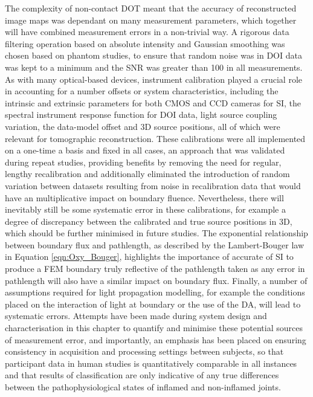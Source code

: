 \documentclass[twoside]{bhamthesis}
\theoremstyle{definition}
\begin{document}
The complexity of non-contact DOT meant that the accuracy of reconstructed image maps was dependant on many measurement parameters, which together will have combined measurement errors in a non-trivial way. A rigorous data filtering operation based on absolute intensity and Gaussian smoothing was chosen based on phantom studies, to ensure that random noise was in DOI data was kept to a minimum and the SNR was greater than 100 in all measurements. As with many optical-based devices, instrument calibration played a crucial role in accounting for a number offsets or system characteristics, including the intrinsic and extrinsic parameters for both CMOS and CCD cameras for SI, the spectral instrument response function for DOI data, light source coupling variation, the data-model offset and 3D source positions, all of which were relevant for tomographic reconstruction. These calibrations were all implemented on a one-time a basis and fixed in all cases, an approach that was validated during repeat studies, providing benefits by removing the need for regular, lengthy recalibration and additionally eliminated the introduction of random variation between datasets resulting from noise in recalibration data that would have an multiplicative impact on boundary fluence. Nevertheless, there will inevitably still be some systematic error in these calibrations, for example a degree of discrepancy between the calibrated and true source positions in 3D, which should be further minimised in future studies. The exponential relationship between boundary flux and pathlength, as described by the Lambert-Bouger law in Equation \ref{eqn:Oxy_Bouger}, highlights the importance of accurate of SI to produce a FEM boundary truly reflective of the pathlength taken as any error in pathlength will also have a similar impact on boundary flux. Finally, a number of assumptions required for light propagation modelling, for example the conditions placed on the interaction of light at boundary or the use of the DA, will lead to systematic errors. Attempts have been made during system design and characterisation in this chapter to quantify and minimise these potential sources of measurement error, and importantly, an emphasis has been placed on ensuring consistency in acquisition and processing settings between subjects, so that participant data in human studies is quantitatively comparable in all instances and that results of classification are only indicative of any true differences between the pathophysiological states of inflamed and non-inflamed joints.
\end{document}
